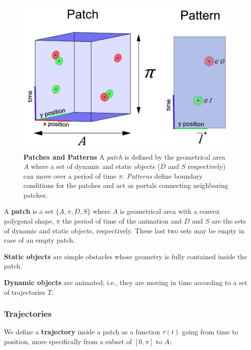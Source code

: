 \begin{figure}[h]
\begin{center}
	\includegraphics[width=0.9\linewidth]{./images/patch-definitions-arrows.png}
	\caption{
		\textbf{Patches and Patterns} A \emph{patch} is defined by the geometrical area $A$ where a set of dynamic and static objects ($D$ and $S$ respectively) can move over a period of time $\pi$. \emph{Patterns} define boundary conditions for the patches and act as portals connecting neighboring patches. 
	}
	\label{fig:definitions}
	\end{center}
\end{figure}
 
A \textbf{patch} is a set $\{ A, \pi, D, S\}$ where $A$ is geometrical area with a convex polygonal shape, $\pi$ the period of time of the animation and $D$ and $S$ are the sets of dynamic and static objects, respectively. 
These last two sets may be empty in case of an empty patch.

\textbf{Static objects} are simple obstacles whose geometry is fully contained inside the patch.

\textbf{Dynamic objects} are animated; i.e., they are moving in time according to a set of trajectories $T$.

\subsubsection{Trajectories}

We define a {\bf trajectory} inside a patch as a function $\tau(t)$ going from time to position, more specifically from a subset of $[ 0,\pi ]$ to $A$:


